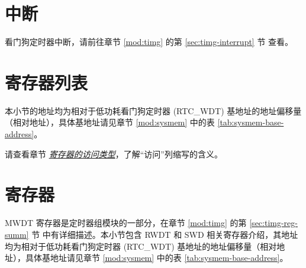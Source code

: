 \documentclass[main\_\_CN.tex]{subfiles}
\begin{document}
\section{中断}

看门狗定时器中断，请前往章节 \ref{mod:timg} \textit{} 的第 \ref{sec:timg-interrupt} 节 \textit{} 查看。



\section{寄存器列表}\label{sec:wdt-reg-summ}

本小节的地址均为相对于低功耗看门狗定时器 (RTC\_WDT) 基地址的地址偏移量（相对地址），具体基地址请见章节 \ref{mod:sysmem} \textit{} 中的表 \ref{tab:sysmem-base-address}。

请查看章节 \hyperref[glossary-access-types]{\textit{寄存器的访问类型}}，了解“访问”列缩写的含义。




\section{寄存器}

MWDT 寄存器是定时器组模块的一部分，在章节 \ref{mod:timg} \textit{} 的第 \ref{sec:timg-reg-summ} 节 \textit{} 中有详细描述。本小节包含 RWDT 和 SWD 相关寄存器介绍，其地址均为相对于低功耗看门狗定时器 (RTC\_WDT) 基地址的地址偏移量（相对地址），具体基地址请见章节 \ref{mod:sysmem} \textit{} 中的表 \ref{tab:sysmem-base-address}。


\end{document}
